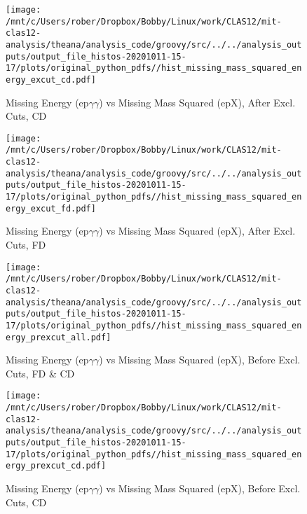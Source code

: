 \documentclass{article}
\begin{document}
\begin{landscape}
    \begin{figure}[h]
        \centering

        \texttt{[image: /mnt/c/Users/rober/Dropbox/Bobby/Linux/work/CLAS12/mit-clas12-analysis/theana/analysis\_code/groovy/src/../../analysis\_outputs/output\_file\_histos-20201011-15-17/plots/original\_python\_pdfs//hist\_missing\_mass\_squared\_energy\_excut\_cd.pdf]}
        \captionsetup{textformat=empty,labelformat=blank}
        \caption{Missing Energy (ep$\gamma$$\gamma$) vs Missing Mass Squared (epX), After Excl. Cuts, CD}
    \end{figure}
    \clearpage
    
    \begin{figure}[h]
        \centering

        \texttt{[image: /mnt/c/Users/rober/Dropbox/Bobby/Linux/work/CLAS12/mit-clas12-analysis/theana/analysis\_code/groovy/src/../../analysis\_outputs/output\_file\_histos-20201011-15-17/plots/original\_python\_pdfs//hist\_missing\_mass\_squared\_energy\_excut\_fd.pdf]}
        \captionsetup{textformat=empty,labelformat=blank}
        \caption{Missing Energy (ep$\gamma$$\gamma$) vs Missing Mass Squared (epX), After Excl. Cuts, FD}
    \end{figure}
    \clearpage
    
    \begin{figure}[h]
        \centering

        \texttt{[image: /mnt/c/Users/rober/Dropbox/Bobby/Linux/work/CLAS12/mit-clas12-analysis/theana/analysis\_code/groovy/src/../../analysis\_outputs/output\_file\_histos-20201011-15-17/plots/original\_python\_pdfs//hist\_missing\_mass\_squared\_energy\_prexcut\_all.pdf]}
        \captionsetup{textformat=empty,labelformat=blank}
        \caption{Missing Energy (ep$\gamma$$\gamma$) vs Missing Mass Squared (epX), Before Excl. Cuts, FD \& CD}
    \end{figure}
    \clearpage
    
    \begin{figure}[h]
        \centering

        \texttt{[image: /mnt/c/Users/rober/Dropbox/Bobby/Linux/work/CLAS12/mit-clas12-analysis/theana/analysis\_code/groovy/src/../../analysis\_outputs/output\_file\_histos-20201011-15-17/plots/original\_python\_pdfs//hist\_missing\_mass\_squared\_energy\_prexcut\_cd.pdf]}
        \captionsetup{textformat=empty,labelformat=blank}
        \caption{Missing Energy (ep$\gamma$$\gamma$) vs Missing Mass Squared (epX), Before Excl. Cuts, CD}
    \end{figure}
    \clearpage
    

\end{landscape}
\end{document}
